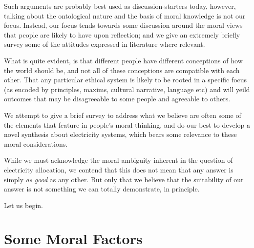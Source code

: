 Such arguments are probably best used as discussion-starters today, however, talking about the ontological nature and the basis of moral knowledge is not our focus.
Instead, our focus tends towards some discussion around the moral views that people are likely to have upon reflection; and we give an extremely briefly survey some of the attitudes expressed in literature where relevant.

What is quite evident, is that different people have different conceptions of how the world should be, and not all of these conceptions are compatible with each other.
That any particular ethical system is likely to be rooted in a specific focus (as encoded by principles, maxims, cultural narrative, language etc) and will yeild outcomes that may be disagreeable to some people and agreeable to others.


We attempt to give a brief survey to address what we believe are often some of the elements that feature in people's moral thinking, and do our best to develop a novel synthesis about electricity systems, which bears some relevance to these moral considerations.

While we must acknowledge the moral ambiguity inherent in the question of electricity allocation, we contend that this does not mean that any answer is simply \textit{as good} as any other. But only that we believe that the suitability of our answer is not something we can totally demonstrate, in principle.

Let us begin.

\section{Some Moral Factors}

